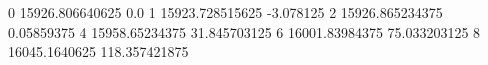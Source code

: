 0 15926.806640625 0.0
1 15923.728515625 -3.078125
2 15926.865234375 0.05859375
4 15958.65234375 31.845703125
6 16001.83984375 75.033203125
8 16045.1640625 118.357421875
